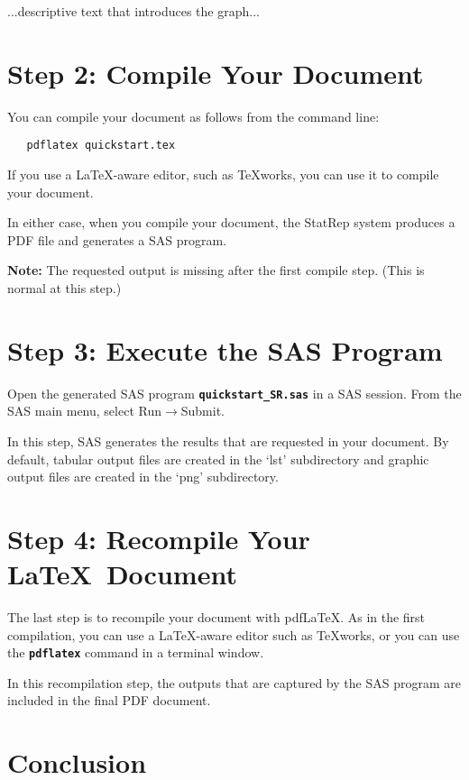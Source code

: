 \documentclass{article}
\newcommand*{\Statrep}{\mbox{\textsf{StatRep}}\xspace}
\newcommand*{\Code}[1]{\texttt{\textbf{#1}}}
\begin{document}
...descriptive text that introduces the graph...



\section{Step 2: Compile Your Document}

You can compile your document as follows from the command line:
\begin{verbatim}
   pdflatex quickstart.tex
\end{verbatim}

If you use a \LaTeX-aware editor, such as \TeX works, you can use it to
compile your document.

In either case, when you compile your document, the 
\Statrep system produces a PDF file and generates a SAS program.

\textbf{Note:} The requested output is missing after the first compile step. 
(This is normal at this step.)

\section{Step 3: Execute the SAS Program}

Open the generated SAS program \Code{quickstart\_SR.sas} in a
SAS session. From the SAS main menu, select 
\textsf{Run}$\rightarrow$\textsf{Submit}.

In this step, SAS generates the results that are requested in your document. 
By default, tabular output files are created in the `lst' subdirectory and
graphic output files are created in the `png' subdirectory.

\section{Step 4: Recompile Your \LaTeX\ Document}

The last step is to recompile your document with pdf\LaTeX. 
As in the first compilation, you can use a \LaTeX-aware editor such 
as \TeX works, or you can use the \Code{pdflatex} command in a terminal window.

In this recompilation step, the outputs that are captured by the SAS program 
are included in the final PDF document.

\section{Conclusion}
\end{document}
